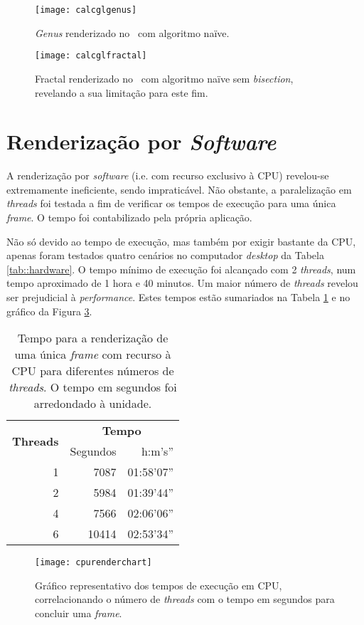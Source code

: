 \begin{figure}[!hbp]
	\centering
	\texttt{[image: calcglgenus]}
	\caption[\textit{Genus} no \theapp~com algoritmo naïve]{\textit{Genus} renderizado no \theapp~com algoritmo naïve.}
	\label{fig::calcglgenus}
\end{figure}

\begin{figure}[!hbp]
	\centering
	\texttt{[image: calcglfractal]}
	\caption[Fractal no \theapp~com algoritmo naïve]{Fractal renderizado no \theapp~com algoritmo naïve sem \textit{bisection}, revelando a sua limitação para este fim.}
	\label{fig::calcglfractal}
\end{figure}


\section{Renderização por \textit{Software}}
\label{sec::testes:software}

A renderização por \textit{software} (i.e. com recurso exclusivo à \ac{CPU}) revelou-se extremamente ineficiente, sendo impraticável. Não obstante, a paralelização em \textit{threads} foi testada a fim de verificar os tempos de execução para uma única \textit{frame}. O tempo foi contabilizado pela própria aplicação.

Não só devido ao tempo de execução, mas também por exigir bastante da \ac{CPU}, apenas foram testados quatro cenários no computador \textit{desktop} da Tabela \ref{tab::hardware}. O tempo mínimo de execução foi alcançado com 2 \textit{threads}, num tempo aproximado de 1 hora e 40 minutos. Um maior número de \textit{threads} revelou ser prejudicial à \textit{performance}. Estes tempos estão sumariados na Tabela \ref{tab::render_cpu} e no gráfico da Figura \ref{fig::cpurenderchart}.

\begin{table}[!bp]
	\centering
	\caption[Tempos de renderização em \acs{CPU}]{Tempo para a renderização de uma única \textit{frame} com recurso à \acs{CPU} para diferentes números de \textit{threads}. O tempo em segundos foi arredondado à unidade.}
	\label{tab::render_cpu}
	\begin{tabular}{r r r}
		\toprule
		\multirow{2}{*}{\textbf{Threads}} & \multicolumn{2}{c}{\textbf{Tempo}} \\
		\cline{2-3}
		& Segundos & h:m's'' \\
		\midrule
		1 &  7087 & 01:58'07'' \\
		2 &  5984 & 01:39'44'' \\
		4 &  7566 & 02:06'06'' \\
		6 & 10414 & 02:53'34'' \\
		\bottomrule
	\end{tabular}
\end{table}

\begin{figure}[!hbtp]
	\centering
	\texttt{[image: cpurenderchart]}
	\caption[Gráfico dos tempos de execução em \acs{CPU}]{Gráfico representativo dos tempos de execução em \acs{CPU}, correlacionando o número de \textit{threads} com o tempo em segundos para concluir uma \textit{frame}.}
	\label{fig::cpurenderchart}
\end{figure}
